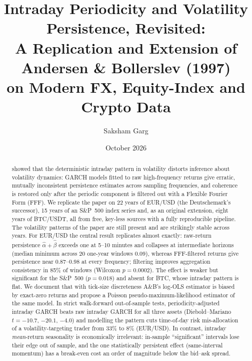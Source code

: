 \documentclass[11pt,a4paper]{article}
\title{Intraday Periodicity and Volatility Persistence, Revisited:\\
A Replication and Extension of Andersen \& Bollerslev (1997)\\ on Modern FX, Equity-Index and Crypto Data}
\author{Saksham Garg}
\date{October 2026}
\begin{document}
\maketitle

\begin{abstract}
\noindent
\citet{AB1997} showed that the deterministic intraday pattern in volatility distorts inference about volatility dynamics: GARCH models fitted to raw high-frequency returns give erratic, mutually inconsistent persistence estimates across sampling frequencies, and coherence is restored only after the periodic component is filtered out with a Flexible Fourier Form (FFF). We replicate the paper on 22 years of EUR/USD (the Deutschemark's successor), 15 years of an S\&P~500 index series and, as an original extension, eight years of BTC/USDT, all from free, key-less sources with a fully reproducible pipeline. The volatility patterns of the paper are still present and are strikingly stable across years. For EUR/USD the central result replicates almost exactly: raw-return persistence $\hat\alpha+\hat\beta$ exceeds one at 5--10 minutes and collapses at intermediate horizons (median minimum across 20 one-year windows 0.09), whereas FFF-filtered returns give persistence near 0.87--0.98 at every frequency; filtering improves aggregation consistency in 85\% of windows (Wilcoxon $p=0.0002$). The effect is weaker but significant for the S\&P~500 ($p=0.018$) and absent for BTC, whose intraday pattern is flat. We document that with tick-size discreteness A\&B's log-OLS estimator is biased by exact-zero returns and propose a Poisson pseudo-maximum-likelihood estimator of the same model. In strict walk-forward out-of-sample tests, periodicity-adjusted intraday GARCH beats raw intraday GARCH for all three assets (Diebold--Mariano $t=-10.7$, $-20.1$, $-4.0$) and modelling the pattern cuts time-of-day risk mis-allocation of a volatility-targeting trader from 33\% to 8\% (EUR/USD). In contrast, intraday \emph{mean}-return seasonality is economically irrelevant: in-sample ``significant'' intervals lose their edge out of sample, and the one statistically persistent effect (same-interval momentum) has a break-even cost an order of magnitude below the bid--ask spread.
\end{abstract}
\end{document}
